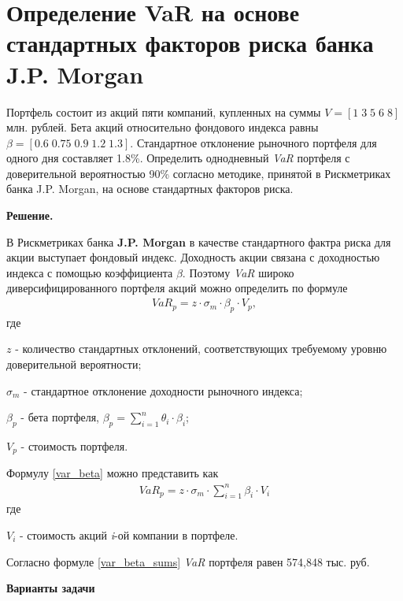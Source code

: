 \documentclass[12pt,a4paper]{article}
\begin{document}
\section{Определение VaR на основе стандартных факторов риска банка J.P. Morgan}

\begin{taskrus}
Портфель состоит из акций пяти компаний, купленных на суммы   $V=[1\;3\;5\;6\;8]$ млн. рублей. Бета акций относительно фондового индекса равны \\$\beta=[0.6\;0.75\;0.9\;1.2\;1.3]$. Стандартное отклонение рыночного портфеля для одного дня составляет 1.8\%. Определить однодневный  \textit{VaR }портфеля с доверительной вероятностью 90\% согласно методике, принятой в Рискметриках банка J.P. Morgan, на основе стандартных факторов риска. 

\textbf{Решение.} 

В Рискметриках банка \textbf{J.P. Morgan }в качестве стандартного фактра риска для акции выступает фондовый индекс. Доходность акции связана с доходностью индекса с помощью коэффициента $\beta$. Поэтому \textit{VaR }широко диверсифицированного портфеля акций можно определить по формуле
\begin{align}
\label{var_beta}
VaR_p=z\cdot \sigma_m\cdot  \beta_p\cdot  V_p,
\end{align}
где

$z$ - количество стандартных отклонений, соответствующих требуемому уровню доверительной вероятности;

$\sigma_m$ - стандартное отклонение доходности рыночного индекса;

$\beta_p$ - бета портфеля, $\beta_p=\sum_{i=1}^n\theta_i \cdot \beta_i$;

$V_p$ - стоимость портфеля.

Формулу \eqref{var_beta} можно представить как
\begin{align}
\label{var_beta_sums}
VaR_p=z \cdot \sigma_m \cdot \sum_{i=1}^n\beta_i \cdot V_i
\end{align}
где

$V_i$ - стоимость акций \textit{i}-ой компании в портфеле.

Согласно формуле \eqref{var_beta_sums} \textit{VaR }портфеля равен 574,848 тыс. руб.

\textbf{Варианты задачи}


\end{taskrus}
\end{document}
